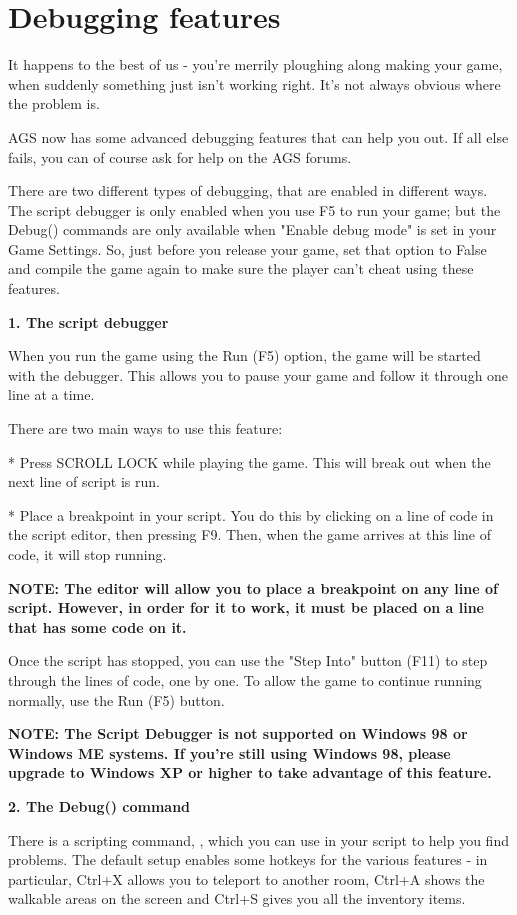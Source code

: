 \section{Debugging features}\label{Debuggingfeatures}%

It happens to the best of us - you're merrily ploughing along making your game, when
suddenly something just isn't working right. It's not always obvious where the problem is.

AGS now has some advanced debugging features that can help you out. If all else fails, you
can of course ask for help on the AGS forums.

There are two different types of debugging, that are enabled in different ways. The script
debugger is only enabled when you use F5 to run your game; but the Debug() commands are
only available when "Enable debug mode" is set in your Game Settings. So, just before you
release your game, set that option to False and compile the game again to make sure the
player can't cheat using these features.

\bf{1. The script debugger}

When you run the game using the Run (F5) option, the game will be started with the debugger.
This allows you to pause your game and follow it through one line at a time.

There are two main ways to use this feature:

* Press SCROLL LOCK while playing the game. This will break out when the next line of script is run.

* Place a breakpoint in your script. You do this by clicking on a line of code
in the script editor, then pressing F9. Then, when the game arrives at this
line of code, it will stop running.

\bf{NOTE:} The editor will allow you to place a breakpoint on any line of script.
However, in order for it to work, it must be placed on a line that has some code on it.

Once the script has stopped, you can use the "Step Into" button (F11) to step through
the lines of code, one by one. To allow the game to continue running normally, use the Run (F5) button.

\bf{NOTE:} The Script Debugger is not supported on Windows 98 or Windows ME systems.
If you're still using Windows 98, please upgrade to Windows XP or higher to take advantage
of this feature.

\bf{2. The Debug() command}

There is a scripting command, , which you can use in your script
to help you find problems. The default setup enables some hotkeys for the various features -
in particular, Ctrl+X allows you to teleport to another room, Ctrl+A shows the walkable
areas on the screen and Ctrl+S gives you all the inventory items.

